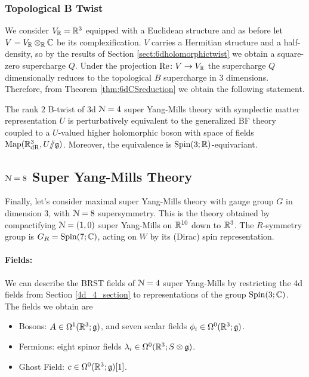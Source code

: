 \documentclass[10pt, oneside]{article}
\renewcommand{\Re}{\mathrm{Re}}
\newcommand{\ham}{/\!\!/}
\begin{document}
\subsubsection{Topological B Twist}
\label{sect:3d_4_B_twist}
We consider $V_\mathbb R=\mathbb R^3$ equipped with a Euclidean structure and as before let $V=V_\mathbb R\otimes_\mathbb R\mathbb C$ be its complexification. $V$ carries a Hermitian structure and a half-density, so by the results of Section \ref{sect:6dholomorphictwist} we obtain a square-zero supercharge $Q$. Under the projection $\Re\colon V\rightarrow V_\RR$ the supercharge $Q$ dimensionally reduces to the topological $B$ supercharge in 3 dimensions. Therefore, from Theorem \ref{thm:6dCSreduction} we obtain the following statement.

\begin{theorem} \label{3d_4_B_twist_thm}
The rank $2$ B-twist of 3d $\mathcal{N}=4$ super Yang-Mills theory with symplectic matter representation $U$ is perturbatively equivalent to the generalized BF theory coupled to a $U$-valued higher holomorphic boson with space of fields $\mr{Map}(\RR^3_{\mr{dR}}, U\ham \gg)$. Moreover, the equivalence is $\mathrm{Spin}(3; \mathbb R)$-equivariant. 
\end{theorem}

\subsection{\texorpdfstring{$\mathcal N = 8$}{N=8} Super Yang-Mills Theory} \label{3d8section}
Finally, let's consider maximal super Yang-Mills theory with gauge group $G$ in dimension 3, with $\mathcal{N}=8$ supersymmetry.  This is the theory obtained by compactifying $\mathcal{N}=(1,0)$ super Yang-Mills on $\mathbb R^{10}$ down to $\mathbb R^3$.  The $R$-symmetry group is $G_R = \mathrm{Spin}(7;\mathbb C)$, acting on $W$ by its (Dirac) spin representation.

\vspace{-10pt}
\paragraph{Fields:} We can describe the BRST fields of $\mathcal{N}=4$ super Yang-Mills by restricting the 4d fields from Section \ref{4d_4_section} to representations of the group $\mathrm{Spin}(3;\mathbb C)$.  The fields we obtain are
\begin{itemize}
 \item Bosons: $A \in \Omega^1(\mathbb R^3; \mathfrak{g})$, and seven scalar fields $\phi_i \in \Omega^0(\mathbb R^3; \mathfrak{g})$.
 \item Fermions: eight spinor fields $\lambda_i \in \Omega^0(\mathbb R^3; S \otimes \mathfrak{g})$.
 \item Ghost Field: $c \in \Omega^0(\mathbb R^3;\mathfrak{g})[1]$.
\end{itemize}
\end{document}
